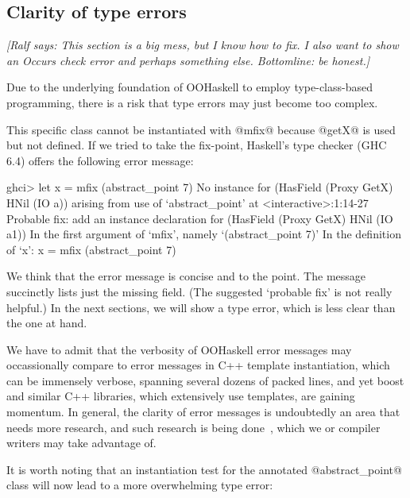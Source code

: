 \documentclass{jfp}
\newcommand{\ralf}[1]{{\it [Ralf says: #1]}}
\begin{document}



\subsection{Clarity of type errors}

\ralf{This section is a big mess, but I know how to fix.
I also want to show an Occurs check error and perhaps something
else. Bottomline: be honest.}

Due to the underlying foundation of OOHaskell to employ
type-class-based programming, there is a risk that type errors may
just become too complex. 

This specific class cannot be instantiated with @mfix@ because @getX@
is used but not defined. If we tried to take the fix-point, Haskell's
type checker (GHC 6.4) offers the following error message:

\begin{code}
 ghci> let x = mfix (abstract_point 7)
 No instance for (HasField (Proxy GetX) HNil (IO a))
   arising from use of `abstract_point' at <interactive>:1:14-27
 Probable fix:
   add an instance declaration for (HasField (Proxy GetX) HNil (IO a1))
 In the first argument of `mfix', namely `(abstract_point 7)'
 In the definition of `x': x = mfix (abstract_point 7)
\end{code}

We think that the error message is concise and to the point. The
message succinctly lists just the missing field. (The suggested
`probable fix' is not really helpful.) In the next sections, we will
show a type error, which is less clear than the one at hand.

We have to admit that the verbosity of OOHaskell error messages may
occassionally compare to error messages in C++ template instantiation,
which can be immensely verbose, spanning several dozens of packed
lines, and yet boost and similar C++ libraries, which extensively use
templates, are gaining momentum. In general, the clarity of error
messages is undoubtedly an area that needs more research, and such
research is being done~\cite{SSW04}, which we or compiler writers may
take advantage of.

It is worth noting that an instantiation test for the annotated
@abstract_point@ class will now lead to a more overwhelming type
error:
\end{document}
